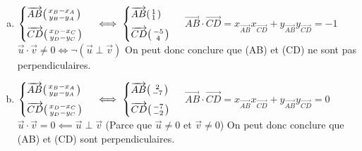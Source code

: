 \documentclass[12pt, a4paper]{article}
\begin{document}
\begin{Exercise}[number={73}]
  \begin{enumerate}[a)]
    \item $\begin{cases}\overrightarrow{AB}\begin{psmallmatrix}x_B-x_A\\y_B-y_A\end{psmallmatrix}\\[0.2cm]\overrightarrow{CD}\begin{psmallmatrix}x_D-x_C\\y_D-y_C\end{psmallmatrix}\end{cases}\iff \begin{cases}\overrightarrow{AB}\begin{psmallmatrix}1\\1\end{psmallmatrix}\\[0.2cm]\overrightarrow{CD}\begin{psmallmatrix}-5\\4\end{psmallmatrix}\end{cases}$ \medbreak $\overrightarrow{AB}\cdot\overrightarrow{CD}=x_{\overrightarrow{AB}}x_{\overrightarrow{CD}}+y_{\overrightarrow{AB}}y_{\overrightarrow{CD}}=-1$ \smallbreak $\vec{u}\cdot\vec{v}\neq0\iff\lnot(\vec{u}\perp\vec{v})$ \smallbreak On peut donc conclure que (AB) et (CD) ne sont pas perpendiculaires.
    \item $\begin{cases}\overrightarrow{AB}\begin{psmallmatrix}x_B-x_A\\y_B-y_A\end{psmallmatrix}\\[0.2cm]\overrightarrow{CD}\begin{psmallmatrix}x_D-x_C\\y_D-y_C\end{psmallmatrix}\end{cases}\iff \begin{cases}\overrightarrow{AB}\begin{psmallmatrix}2\\-7\end{psmallmatrix}\\[0.2cm]\overrightarrow{CD}\begin{psmallmatrix}-7\\-2\end{psmallmatrix}\end{cases}$ \medbreak $\overrightarrow{AB}\cdot\overrightarrow{CD}=x_{\overrightarrow{AB}}x_{\overrightarrow{CD}}+y_{\overrightarrow{AB}}y_{\overrightarrow{CD}}=0$ \medbreak $\vec{u}\cdot\vec{v}=0\impliedby \vec{u}\perp \vec{v}$ \quad (Parce que $\vec{u}\neq0$ et $\vec{v}\neq0$) \smallbreak On peut donc conclure que (AB) et (CD) sont perpendiculaires.

\end{enumerate}
\end{Exercise}
\end{document}
